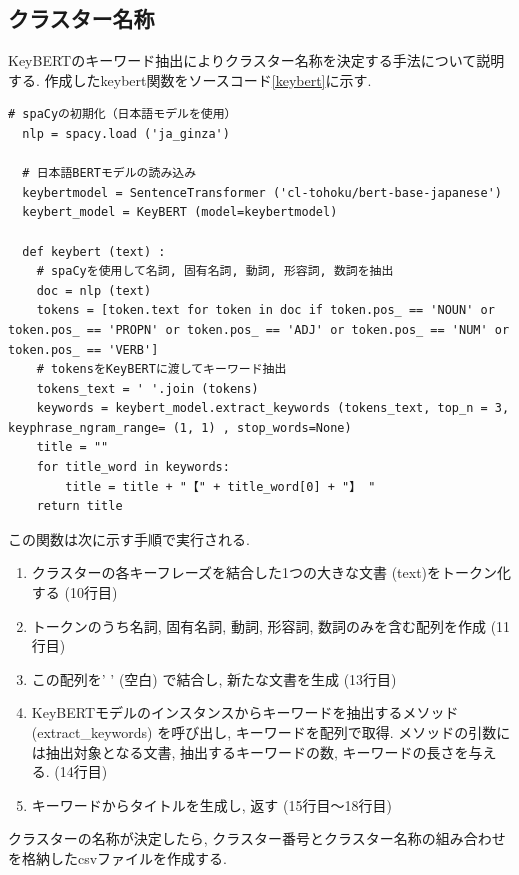 \subsection{クラスター名称}
KeyBERTのキーワード抽出によりクラスター名称を決定する手法について説明する. 作成したkeybert関数をソースコード\ref{keybert}に示す. 

\begin{lstlisting}[caption=keybert関数, label=keybert]
  # spaCyの初期化（日本語モデルを使用）
  nlp = spacy.load ('ja_ginza') 

  # 日本語BERTモデルの読み込み
  keybertmodel = SentenceTransformer ('cl-tohoku/bert-base-japanese') 
  keybert_model = KeyBERT (model=keybertmodel) 

  def keybert (text) :
    # spaCyを使用して名詞, 固有名詞, 動詞, 形容詞, 数詞を抽出
    doc = nlp (text) 
    tokens = [token.text for token in doc if token.pos_ == 'NOUN' or token.pos_ == 'PROPN' or token.pos_ == 'ADJ' or token.pos_ == 'NUM' or token.pos_ == 'VERB']
    # tokensをKeyBERTに渡してキーワード抽出
    tokens_text = ' '.join (tokens) 
    keywords = keybert_model.extract_keywords (tokens_text, top_n = 3, keyphrase_ngram_range= (1, 1) , stop_words=None) 
    title = ""
    for title_word in keywords:
        title = title + "【" + title_word[0] + "】 "
    return title
\end{lstlisting}

この関数は次に示す手順で実行される. 

\begin{enumerate}
  \item クラスターの各キーフレーズを結合した1つの大きな文書 (text)をトークン化する (10行目)
  \item トークンのうち名詞, 固有名詞, 動詞, 形容詞, 数詞のみを含む配列を作成 (11行目)
  \item この配列を' ' (空白) で結合し, 新たな文書を生成 (13行目)
  \item KeyBERTモデルのインスタンスからキーワードを抽出するメソッド (extract\_keywords) を呼び出し, キーワードを配列で取得. メソッドの引数には抽出対象となる文書, 抽出するキーワードの数, キーワードの長さを与える. (14行目)
  \item キーワードからタイトルを生成し, 返す (15行目〜18行目)
\end{enumerate}

クラスターの名称が決定したら, クラスター番号とクラスター名称の組み合わせを格納したcsvファイルを作成する. 


